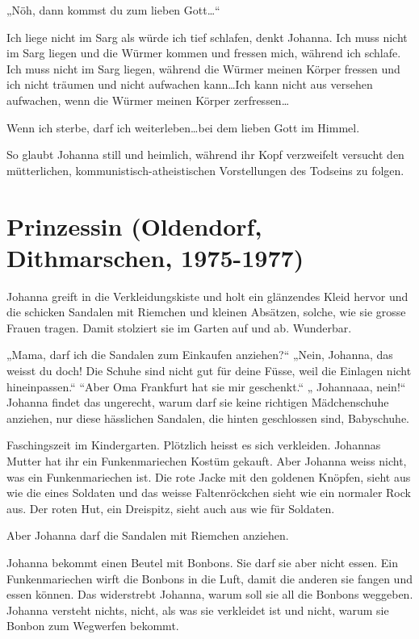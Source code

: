 \documentclass[10pt,a5paper]{book}
\begin{document}
„Nöh, dann kommst du zum lieben Gott\dots“

Ich liege nicht im Sarg als würde ich tief schlafen, denkt Johanna. Ich muss nicht im Sarg liegen und die Würmer kommen und fressen mich, während ich schlafe. Ich muss nicht im Sarg liegen, während die Würmer meinen Körper fressen und ich nicht träumen und nicht aufwachen kann\dots Ich kann nicht aus versehen aufwachen, wenn die Würmer meinen Körper zerfressen\dots

Wenn ich sterbe, darf ich weiterleben\dots bei dem lieben Gott im Himmel.

So glaubt Johanna still und heimlich, während ihr Kopf verzweifelt versucht den mütterlichen, kommunistisch-atheistischen Vorstellungen des Todseins zu folgen.


\section*{Prinzessin (Oldendorf, Dithmarschen, 1975-1977)}



Johanna greift in die Verkleidungskiste und holt ein glänzendes Kleid hervor und die schicken Sandalen mit Riemchen und kleinen Absätzen, solche, wie sie grosse Frauen tragen. Damit stolziert sie im Garten auf und ab.
 Wunderbar. 
 
 „Mama, darf  ich die Sandalen zum Einkaufen anziehen?“ „Nein, Johanna, das weisst du doch! Die Schuhe sind nicht gut für deine Füsse, weil die Einlagen nicht hineinpassen.“ “Aber Oma Frankfurt hat sie mir geschenkt.“ „ Johannaaa, nein!“ Johanna findet das ungerecht, warum darf sie keine richtigen Mädchenschuhe anziehen, nur diese hässlichen Sandalen, die hinten geschlossen sind, Babyschuhe.
 
Faschingszeit im Kindergarten. Plötzlich heisst es sich verkleiden. Johannas Mutter hat ihr ein Funkenmariechen Kostüm gekauft. Aber Johanna weiss nicht, was ein Funkenmariechen ist. Die rote Jacke mit den goldenen Knöpfen, sieht aus wie die eines Soldaten und das weisse Faltenröckchen sieht wie ein normaler Rock aus. Der roten Hut, ein Dreispitz, sieht auch aus wie für Soldaten. 

Aber Johanna darf die Sandalen mit Riemchen anziehen. 

Johanna bekommt einen Beutel mit Bonbons. Sie darf sie aber nicht essen. Ein Funkenmariechen wirft die Bonbons in die Luft, damit die anderen sie fangen und essen können. Das widerstrebt Johanna, warum soll sie all die Bonbons weggeben. Johanna versteht nichts, nicht, als was sie verkleidet ist und nicht, warum sie Bonbon zum Wegwerfen bekommt.
\end{document}
